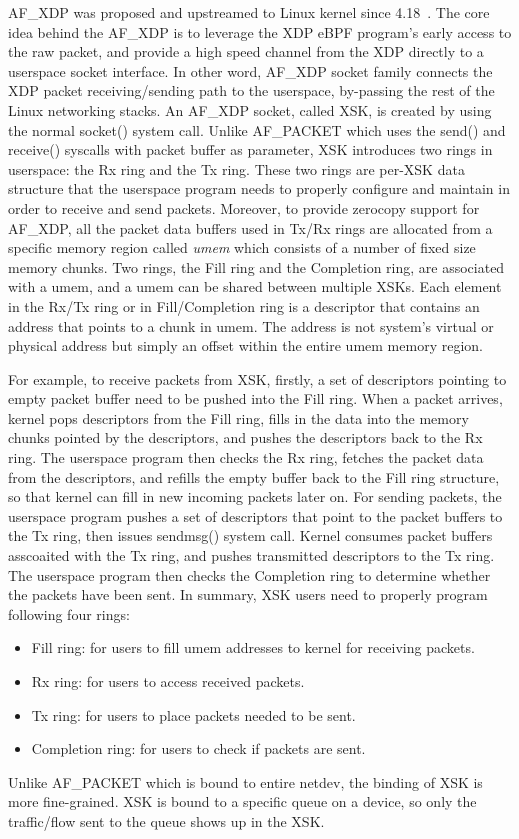 \documentclass[10pt]{sigplanconf}
\begin{document}
AF\_XDP was proposed and upstreamed to Linux kernel since 4.18~\cite{af_xdp_lwn}.
The core idea behind the AF\_XDP is to leverage the XDP eBPF program's
early access to the raw packet, and provide a high speed channel from the XDP
directly to a userspace socket interface. In other word, AF\_XDP socket family
connects the XDP packet receiving/sending path to the userspace, by-passing the
rest of the Linux networking stacks.
An AF\_XDP socket, called XSK, is created by using the normal socket() system
call. Unlike AF\_PACKET which uses the send() and receive() syscalls with packet
buffer as parameter, XSK introduces two rings in userspace: the Rx ring and the
Tx ring. These two rings are per-XSK data structure that the userspace program
needs to properly configure and maintain in order to receive and send packets.
Moreover, to provide zerocopy support for AF\_XDP, all the packet data buffers
used in Tx/Rx rings are allocated from a specific memory region called {\em umem}
which consists of a number of fixed size memory chunks.
Two rings, the Fill ring and the Completion ring, are associated with a umem,
and a umem can be shared between multiple XSKs.
Each element in the Rx/Tx ring or in Fill/Completion ring is a descriptor that
contains an address that points to a chunk in umem. The address is not system's
virtual or physical address but simply an offset within the entire umem memory
region.

For example, to receive packets from XSK, firstly, a set of descriptors pointing
to empty packet buffer need to be pushed into the Fill ring.  When a packet
arrives, kernel pops descriptors from the Fill ring, fills in the data into the
memory chunks pointed by the descriptors, and pushes the descriptors back to
the Rx ring.
The userspace program then checks the Rx ring, fetches the packet data from the
descriptors, and refills the empty buffer back to the Fill ring structure, so
that kernel can fill in new incoming packets later on.
For sending packets, the userspace program pushes a set of descriptors that
point to the packet buffers to the Tx ring, then issues sendmsg() system call.
Kernel consumes packet buffers asscoaited with the Tx ring, and pushes
transmitted descriptors to the Tx ring.
The userspace program then checks the Completion ring to determine whether the
packets have been sent.
In summary, XSK users need to properly program following four rings:
\begin{itemize}
\item Fill ring: for users to fill umem addresses to kernel for receiving packets.
\item Rx ring: for users to access received packets.
\item Tx ring: for users to place packets needed to be sent.
\item Completion ring: for users to check if packets are sent.
\end{itemize}
Unlike AF\_PACKET which is bound to entire netdev, the binding of XSK is more
fine-grained. XSK is bound to a specific queue on a device, so only the
traffic/flow sent to the queue shows up in the XSK.
\end{document}
